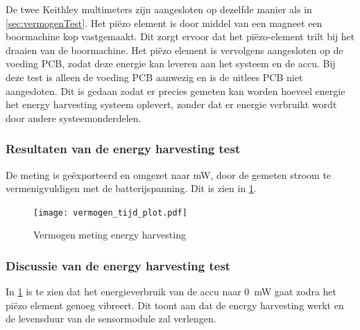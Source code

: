 De twee Keithley multimeters zijn aangesloten op dezelfde manier als in \cref{sec:vermogenTest}. Het piëzo element is door middel van een magneet een boormachine kop vastgemaakt. Dit zorgt ervoor dat het piëzo-element trilt bij het draaien van de boormachine. Het piëzo element is vervolgens aangesloten op de voeding PCB, zodat deze energie kan leveren aan het systeem en de accu. Bij deze test is alleen de voeding PCB aanwezig en is de uitlees PCB niet aangesloten. Dit is gedaan zodat er precies gemeten kan worden hoeveel energie het energy harvesting systeem oplevert, zonder dat er energie verbruikt wordt door andere systeemonderdelen.

\subsubsection{Resultaten van de energy harvesting test}
De meting is geëxporteerd en omgezet naar mW, door de gemeten stroom te vermenigvuldigen met de batterijspanning. Dit is zien in \cref{fig:vermogenPlot}.

\begin{figure}[!htbp]
    \centering
    \texttt{[image: vermogen\_tijd\_plot.pdf]}
    \caption{Vermogen meting energy harvesting}
    \label{fig:vermogenPlot}
\end{figure}

\subsubsection{Discussie van de energy harvesting test}
In \cref{fig:vermogenPlot} is te zien dat het energieverbruik van de accu naar \qty{0}{\milli\watt} gaat zodra het piëzo element genoeg vibreert. Dit toont aan dat de energy harvesting werkt en de levensduur van de sensormodule zal verlengen.
